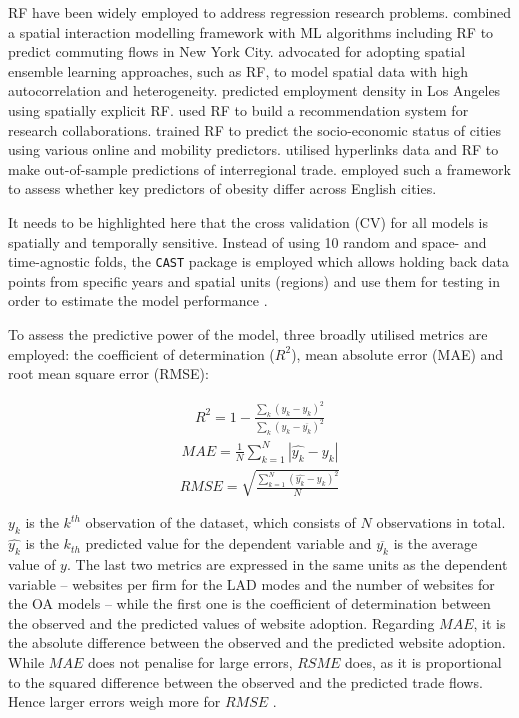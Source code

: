 \documentclass[
  authoryear,
  preprint,
  3p]{elsarticle}
\begin{document}
RF have been widely employed to address regression research problems.
\citet{pourebrahim2019trip} combined a spatial interaction modelling
framework with ML algorithms including RF to predict commuting flows in
New York City. \citet{sinha2019assessing} advocated for adopting spatial
ensemble learning approaches, such as RF, to model spatial data with
high autocorrelation and heterogeneity. \citet{creditspatial} predicted
employment density in Los Angeles using spatially explicit RF.
\citet{guns2014recommending} used RF to build a recommendation system
for research collaborations. \citet{ren2019predicting} trained RF to
predict the socio-economic status of cities using various online and
mobility predictors. \citet{tranos2023using} utilised hyperlinks data
and RF to make out-of-sample predictions of interregional trade.
\citet{zhou2023geography} employed such a framework to assess whether
key predictors of obesity differ across English cities.

It needs to be highlighted here that the cross validation (CV) for all
models is spatially and temporally sensitive. Instead of using 10 random
and space- and time-agnostic folds, the \texttt{CAST} package is
employed which allows holding back data points from specific years and
spatial units (regions) and use them for testing in order to estimate
the model performance \citep{meyer2018improving}.

To assess the predictive power of the model, three broadly utilised
metrics are employed: the coefficient of determination (\(R^2\)), mean
absolute error (MAE) and root mean square error (RMSE):

\begin{align}
R^2 = 1 - \frac{\sum_{k} (y_{k} - \hat{y_{k}})^2} {\sum_{k} (y_{k} - \overline{y_{k}})^2} \label{eq:rsquared}
\end{align} \begin{align}
MAE = \frac{1}{N} \sum_{k = 1}^{N} |\hat{y_{k}} - y_{k}| \label{eq:mae}
\end{align} \begin{align}
RMSE =  \sqrt{\frac{\sum_{k = 1}^{N} (\hat{y_{k}} - y_{k})^2} {N}} \label{eq:rmse}
\end{align}

\noindent \(y_{k}\) is the \(k^{th}\) observation of the dataset, which
consists of \(N\) observations in total. \(\hat{y_{k}}\) is the
\(k_{th}\) predicted value for the dependent variable and
\(\overline{y_{k}}\) is the average value of \(y\). The last two metrics
are expressed in the same units as the dependent variable -- websites
per firm for the LAD modes and the number of websites for the OA models
-- while the first one is the coefficient of determination between the
observed and the predicted values of website adoption. Regarding
\(MAE\), it is the absolute difference between the observed and the
predicted website adoption. While \(MAE\) does not penalise for large
errors, \(RSME\) does, as it is proportional to the squared difference
between the observed and the predicted trade flows. Hence larger errors
weigh more for \(RMSE\) \citep{pontius2008components}.
\end{document}
